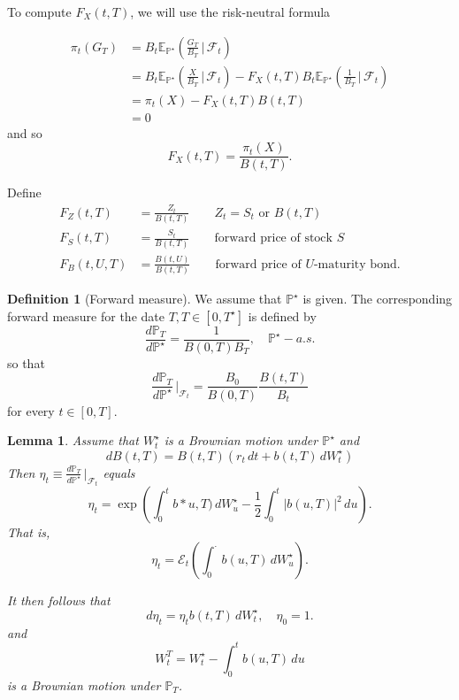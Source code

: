 \documentclass[10pt, oneside, reqno]{amsbook}
\theoremstyle{plain}%
\newtheorem{lem}[thm]{Lemma}
\theoremstyle{definition}
\newtheorem{defn}[thm]{Definition}
\theoremstyle{remark}
\newcommand{\given}{ \, | \,}
\newcommand{\sigf}{\mathcal{F}}
\newcommand{\E}{\mathbb{E}}
\renewcommand{\P}{\mathbb{P}}
\newcommand{\doleans}[1]{\mathcal E_t \left(\int_0^\cdot #1 \right)}
\numberwithin{equation}{chapter}
\begin{document}
To compute $F_X(t, T)$, we will use the risk-neutral formula

\begin{align*}
    \pi_t(G_T) &= B_t \E_{\P^\star} \left( \frac{G_T}{B_T} \given \sigf_t \right) \\
        &= B_t \E_{\P^\star} \left( \frac{X}{B_T} \given \sigf_t \right) - F_X(t, T) B_t \E_{\P^\star} \left(\frac{1}{B_T} \given \sigf_t \right) \\
        &= \pi_t(X) - F_X(t, T) B(t, T) \\
        &= 0
\end{align*} and so \[
    F_X(t, T) = \frac{\pi_t(X)}{B(t, T)}.
\] 

Define \begin{align*}
    F_Z(t, T) &= \frac{Z_t}{B(t, T)} \qquad \text{$Z_t = S_t$ or $B(t, T)$} \\
    F_S(t, T) &= \frac{S_t}{B(t, T)} \qquad \text{forward price of stock $S$}\\
    F_B(t, U, T) &= \frac{B(t, U)}{B(t, T)} \qquad \text{forward price of $U$-maturity bond}.
\end{align*}

\begin{defn}[Forward measure]
    
    We assume that $\P^\star$ is given.  The corresponding forward measure for the date $T, T \in [0, T^\star]$ is defined by \[
        \frac{d\P_T}{d\P^\star} = \frac{1}{B(0,T) B_T}, \quad \P^\star-a.s.
    \] so that \[
        \frac{d\P_T}{d\P^\star} \, |_{\sigf_t} = \frac{B_0}{B(0, T)} \frac{B(t, T)}{B_t}
    \] for every $t \in [0, T]$.
\end{defn}

\begin{lem}
    Assume that $W_t^\star$ is a Brownian motion under $\P^\star$ and \[
        dB(t, T) = B(t, T) \left( r_t \, dt + b(t, T) \, dW^\star_t \right)
    \]  Then $\eta_t \equiv \frac{d\P_T}{d\P^\star} \, |_{\sigf_t}$ equals \[
        \eta_t = \exp \left( \int_0^t b*u, T) \, dW^\star_u - \frac{1}{2} \int_0^t \left| b(u, T) \right|^2 \, du \right).
    \]  That is, \[
        \eta_t = \doleans{b(u, T) \, dW^\star_u}. 
        \tag{$\star$}
    \]  
    
    It then follows that \[
        d \eta_t = \eta_t b(t, T) \, dW^\star_t, \quad \eta_0 = 1.
    \] and \[
        W_t^T = W^\star_t - \int_0^t b(u, T) \, du
    \] is a Brownian motion under $\P_T$.
\end{lem}
\end{document}
